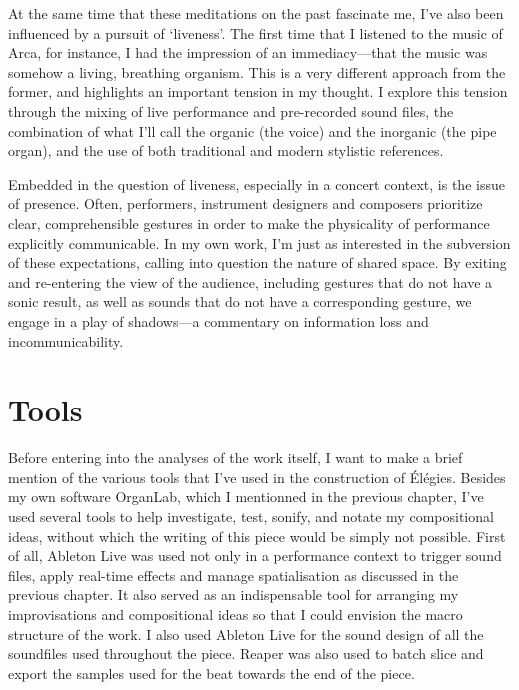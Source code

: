 \documentclass[12pt,twoside,maitrise]{dms_ks}
\theoremstyle{definition}
\begin{document}
{At the same time that these meditations on the past fascinate me, I've also been influenced by a pursuit of `liveness'. 
The first time that I listened to the music of Arca, for instance, I had the impression of an immediacy---that the music was somehow a living, breathing organism. 
This is a very different approach from the former, and highlights an important tension in my thought. 
I explore this tension through the mixing of live performance and pre-recorded sound files, the combination of what I'll call the organic (the voice) and the inorganic (the pipe organ), and the use of both traditional and modern stylistic references.

Embedded in the question of liveness, especially in a concert context, is the issue of presence. 
Often, performers, instrument designers and composers prioritize clear, comprehensible gestures in order to make the physicality of performance explicitly communicable. 
In my own work, I'm just as interested in the subversion of these expectations, calling into question the nature of shared space. 
By exiting and re-entering the view of the audience, including gestures that do not have a sonic result, as well as sounds that do not have a corresponding gesture, we engage in a play of shadows---a commentary on information loss and incommunicability. 

\section{Tools}

Before entering into the analyses of the work itself, I want to make a brief mention of the various tools that I've used in the construction of Élégies. 
Besides my own software OrganLab, which I mentionned in the previous chapter, I've used several tools to help investigate, test, sonify, and notate my compositional ideas, without which the writing of this piece would be simply not possible. 
First of all, Ableton Live was used not only in a performance context to trigger sound files, apply real-time effects and manage spatialisation as discussed in the previous chapter. 
It also served as an indispensable tool for arranging my improvisations and compositional ideas so that I could envision the macro structure of the work. 
I also used Ableton Live for the sound design of all the soundfiles used throughout the piece. 
Reaper was also used to batch slice and export the samples used for the beat towards the end of the piece.

}
\end{document}
